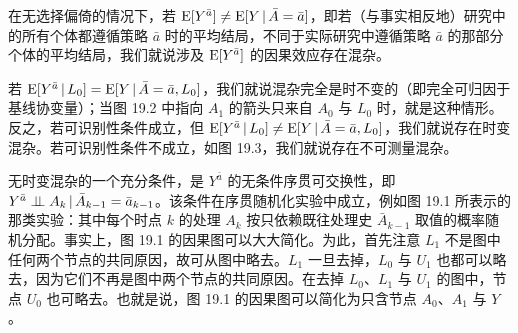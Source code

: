 \begin{finepoint}[时变混杂的定义]
在无选择偏倚的情况下，若 $\mathrm{E}[Y^{\bar{a}}]\neq \mathrm{E}[Y\,|\, \bar{A}=\bar{a}]$，即若（与事实相反地）研究中的所有个体都遵循策略 $\bar{a}$ 时的平均结局，不同于实际研究中遵循策略 $\bar{a}$ 的那部分个体的平均结局，我们就说涉及 $\mathrm{E}[Y^{\bar{a}}]$ 的因果效应存在混杂。

若 $\mathrm{E}[Y^{\bar{a}}\,|\, L_0]=\mathrm{E}[Y\,|\, \bar{A}=\bar{a},L_0]$，我们就说混杂完全是时不变的（即完全可归因于基线协变量）；当图 19.2 中指向 $A_1$ 的箭头只来自 $A_0$ 与 $L_0$ 时，就是这种情形。反之，若可识别性条件成立，但 $\mathrm{E}[Y^{\bar{a}}\,|\, L_0]\neq \mathrm{E}[Y\,|\, \bar{A}=\bar{a},L_0]$，我们就说存在时变混杂。若可识别性条件不成立，如图 19.3，我们就说存在不可测量混杂。

无时变混杂的一个充分条件，是 $Y^{\bar{a}}$ 的无条件序贯可交换性，即 $Y^{\bar{a}}\perp\!\!\!\perp A_k\,|\, \bar{A}_{k-1}=\bar{a}_{k-1}$。该条件在序贯随机化实验中成立，例如图 19.1 所表示的那类实验：其中每个时点 $k$ 的处理 $A_k$ 按只依赖既往处理史 $\bar{A}_{k-1}$ 取值的概率随机分配。事实上，图 19.1 的因果图可以大大简化。为此，首先注意 $L_1$ 不是图中任何两个节点的共同原因，故可从图中略去。$L_1$ 一旦去掉，$L_0$ 与 $U_1$ 也都可以略去，因为它们不再是图中两个节点的共同原因。在去掉 $L_0$、$L_1$ 与 $U_1$ 的图中，节点 $U_0$ 也可略去。也就是说，图 19.1 的因果图可以简化为只含节点 $A_0$、$A_1$ 与 $Y$。
\end{finepoint}

